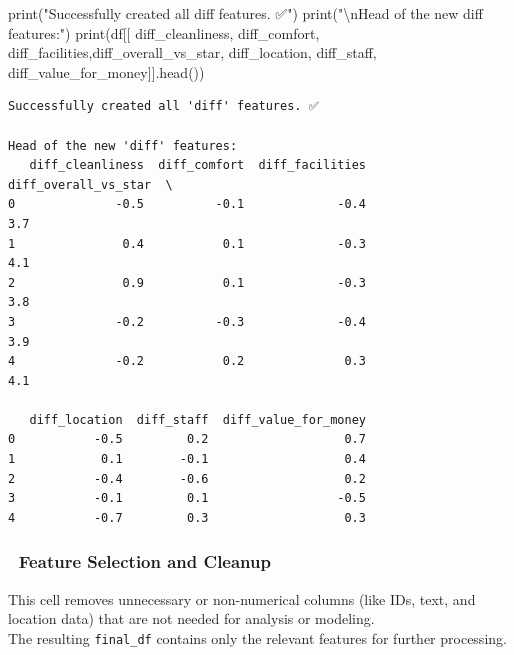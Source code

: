 \documentclass[
  letterpaper,
  DIV=11,
  numbers=noendperiod]{scrartcl}
\newenvironment{Shaded}{\begin{snugshade}}{\end{snugshade}}
\newcommand{\BuiltInTok}[1]{\textcolor[rgb]{0.00,0.23,0.31}{#1}}
\newcommand{\CharTok}[1]{\textcolor[rgb]{0.13,0.47,0.30}{#1}}
\newcommand{\NormalTok}[1]{\textcolor[rgb]{0.00,0.23,0.31}{#1}}
\newcommand{\StringTok}[1]{\textcolor[rgb]{0.13,0.47,0.30}{#1}}
\begin{document}
\begin{Shaded}
\begin{Highlighting}[]
\BuiltInTok{print}\NormalTok{(}\StringTok{"Successfully created all \textquotesingle{}diff\textquotesingle{} features. ✅"}\NormalTok{)}
\BuiltInTok{print}\NormalTok{(}\StringTok{"}\CharTok{\textbackslash{}n}\StringTok{Head of the new \textquotesingle{}diff\textquotesingle{} features:"}\NormalTok{)}
\BuiltInTok{print}\NormalTok{(df[[ }\StringTok{\textquotesingle{}diff\_cleanliness\textquotesingle{}}\NormalTok{, }\StringTok{\textquotesingle{}diff\_comfort\textquotesingle{}}\NormalTok{, }\StringTok{\textquotesingle{}diff\_facilities\textquotesingle{}}\NormalTok{,}\StringTok{\textquotesingle{}diff\_overall\_vs\_star\textquotesingle{}}\NormalTok{, }\StringTok{\textquotesingle{}diff\_location\textquotesingle{}}\NormalTok{, }\StringTok{\textquotesingle{}diff\_staff\textquotesingle{}}\NormalTok{, }\StringTok{\textquotesingle{}diff\_value\_for\_money\textquotesingle{}}\NormalTok{]].head())}
\end{Highlighting}
\end{Shaded}

\begin{verbatim}
Successfully created all 'diff' features. ✅

Head of the new 'diff' features:
   diff_cleanliness  diff_comfort  diff_facilities  diff_overall_vs_star  \
0              -0.5          -0.1             -0.4                   3.7   
1               0.4           0.1             -0.3                   4.1   
2               0.9           0.1             -0.3                   3.8   
3              -0.2          -0.3             -0.4                   3.9   
4              -0.2           0.2              0.3                   4.1   

   diff_location  diff_staff  diff_value_for_money  
0           -0.5         0.2                   0.7  
1            0.1        -0.1                   0.4  
2           -0.4        -0.6                   0.2  
3           -0.1         0.1                  -0.5  
4           -0.7         0.3                   0.3  
\end{verbatim}

\subsubsection{🧹 Feature Selection and
Cleanup}\label{feature-selection-and-cleanup}

This cell removes unnecessary or non-numerical columns (like IDs, text,
and location data) that are not needed for analysis or modeling.\\
The resulting \texttt{final\_df} contains only the relevant features for
further processing.
\end{document}

